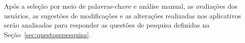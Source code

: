 Após a seleção por meio de palavras-chave e análise manual, 
as avaliações dos usuários, as sugestões de modificações e as alterações realizadas nos aplicativos serão analisadas para responder as questões de pesquisa definidas na Seção~\ref{sec:questoespesquisa}.


	
	
	
	


